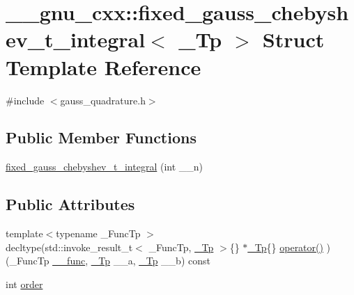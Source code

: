 \hypertarget{struct____gnu__cxx_1_1fixed__gauss__chebyshev__t__integral}{}\section{\+\_\+\+\_\+gnu\+\_\+cxx\+:\+:fixed\+\_\+gauss\+\_\+chebyshev\+\_\+t\+\_\+integral$<$ \+\_\+\+Tp $>$ Struct Template Reference}
\label{struct____gnu__cxx_1_1fixed__gauss__chebyshev__t__integral}


{\ttfamily \#include $<$gauss\+\_\+quadrature.\+h$>$}

\subsection*{Public Member Functions}
\begin{DoxyCompactItemize}
\item 
\hyperlink{struct____gnu__cxx_1_1fixed__gauss__chebyshev__t__integral_a681b1b368ba8b72a8043442f4c25f980}{fixed\+\_\+gauss\+\_\+chebyshev\+\_\+t\+\_\+integral} (int \+\_\+\+\_\+n)
\end{DoxyCompactItemize}
\subsection*{Public Attributes}
\begin{DoxyCompactItemize}
\item 
{\footnotesize template$<$typename \+\_\+\+Func\+Tp $>$ }\\decltype(std\+::invoke\+\_\+result\+\_\+t$<$ \+\_\+\+Func\+Tp, \hyperlink{namespace____gnu__cxx_a3b19a9c800ca194374ef9172290f7d79}{\+\_\+\+Tp} $>$\{\} $\ast$\hyperlink{namespace____gnu__cxx_a3b19a9c800ca194374ef9172290f7d79}{\+\_\+\+Tp}\{\} \hyperlink{struct____gnu__cxx_1_1fixed__gauss__chebyshev__t__integral_a9f85a9c4a9cdafcc17d7691192ad3991}{operator()} )(\+\_\+\+Func\+Tp \hyperlink{namespace____gnu__cxx_af2b2f0c7a2ae72b922b1afefae5a65b2}{\+\_\+\+\_\+func}, \hyperlink{namespace____gnu__cxx_a3b19a9c800ca194374ef9172290f7d79}{\+\_\+\+Tp} \+\_\+\+\_\+a, \hyperlink{namespace____gnu__cxx_a3b19a9c800ca194374ef9172290f7d79}{\+\_\+\+Tp} \+\_\+\+\_\+b) const
\item 
int \hyperlink{struct____gnu__cxx_1_1fixed__gauss__chebyshev__t__integral_a591563313b6205bd714cf1343cc48192}{order}
\end{DoxyCompactItemize}


